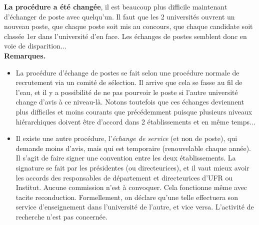 \textbf{La proc\'edure a \'et\'e chang\'ee}, il est beaucoup plus difficile maintenant d'\'echanger de poste avec quelqu'un. 
Il faut que les 2 universit\'es ouvrent un nouveau poste, que chaque poste soit mis au concours, que chaque candidat\mp e soit class\'e\mp e 1er dans l'universit\'e d'en face. 
Les \'echanges de postes semblent donc en voie de disparition... \\

{\bf Remarques.}
\begin{itemize}
\item La proc\'edure d'\'echange de postes se fait selon une proc\'edure normale de recrutement via un comit\'e de s\'election. Il arrive que cela se fasse au fil de l'eau, et il y a possibilit\'e de ne pas pourvoir le poste si l'autre universit\'e change d'avis \`a ce niveau-l\`a. Notons toutefois que ces \og \'echanges\fg{} deviennent plus difficiles et moins courants que pr\'ec\'edemment puisque plusieurs niveaux hi\'erarchiques doivent \^etre d'accord dans 2 \'etablissements et en m\^eme temps...
\item Il existe une autre proc\'edure, l'{\em \'echange de service}
(et non de poste), qui demande moins d'avis, mais qui est temporaire
(renouvelable chaque ann\'ee).
Il s'agit de faire signer une convention entre les
deux \'etablissements. La signature se fait par les pr\'esident\mp e\mp s (ou
directeur\mp ice\mp s), et il vaut mieux avoir les accords des responsables de
d\'epartement et directeur\mp ice\mp s d'UFR ou Institut. Aucune commission
n'est \`a convoquer. Cela fonctionne m\^eme avec tacite
reconduction. Formellement, on d\'eclare qu'un\mp e tel\mp le effectuera son
service d'enseignement dans l'universit\'e de l'autre, et vice
versa. L'activit\'e de recherche n'est pas concern\'ee.
\end{itemize}


